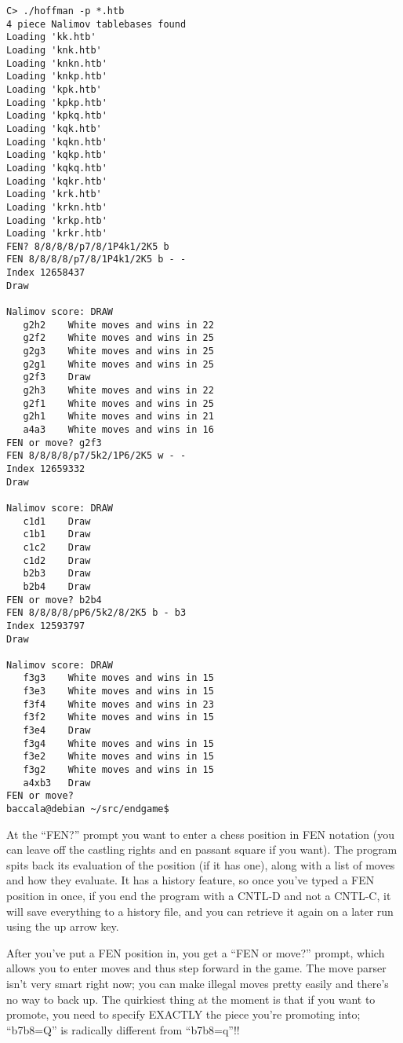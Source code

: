 \documentclass[11pt]{article}
\begin{document}
\begin{verbatim}
C> ./hoffman -p *.htb
4 piece Nalimov tablebases found
Loading 'kk.htb'
Loading 'knk.htb'
Loading 'knkn.htb'
Loading 'knkp.htb'
Loading 'kpk.htb'
Loading 'kpkp.htb'
Loading 'kpkq.htb'
Loading 'kqk.htb'
Loading 'kqkn.htb'
Loading 'kqkp.htb'
Loading 'kqkq.htb'
Loading 'kqkr.htb'
Loading 'krk.htb'
Loading 'krkn.htb'
Loading 'krkp.htb'
Loading 'krkr.htb'
FEN? 8/8/8/8/p7/8/1P4k1/2K5 b
FEN 8/8/8/8/p7/8/1P4k1/2K5 b - -
Index 12658437
Draw

Nalimov score: DRAW
   g2h2    White moves and wins in 22
   g2f2    White moves and wins in 25
   g2g3    White moves and wins in 25
   g2g1    White moves and wins in 25
   g2f3    Draw
   g2h3    White moves and wins in 22
   g2f1    White moves and wins in 25
   g2h1    White moves and wins in 21
   a4a3    White moves and wins in 16
FEN or move? g2f3
FEN 8/8/8/8/p7/5k2/1P6/2K5 w - -
Index 12659332
Draw

Nalimov score: DRAW
   c1d1    Draw
   c1b1    Draw
   c1c2    Draw
   c1d2    Draw
   b2b3    Draw
   b2b4    Draw
FEN or move? b2b4
FEN 8/8/8/8/pP6/5k2/8/2K5 b - b3
Index 12593797
Draw

Nalimov score: DRAW
   f3g3    White moves and wins in 15
   f3e3    White moves and wins in 15
   f3f4    White moves and wins in 23
   f3f2    White moves and wins in 15
   f3e4    Draw
   f3g4    White moves and wins in 15
   f3e2    White moves and wins in 15
   f3g2    White moves and wins in 15
   a4xb3   Draw
FEN or move?
baccala@debian ~/src/endgame$
\end{verbatim}

At the ``FEN?'' prompt you want to enter a chess position in FEN
notation (you can leave off the castling rights and en passant square
if you want).  The program spits back its evaluation of the position
(if it has one), along with a list of moves and how they evaluate.  It
has a history feature, so once you've typed a FEN position in once, if
you end the program with a CNTL-D and not a CNTL-C, it will save
everything to a history file, and you can retrieve it again on a later
run using the up arrow key.

After you've put a FEN position in, you get a ``FEN or move?'' prompt,
which allows you to enter moves and thus step forward in the game.
The move parser isn't very smart right now; you can make illegal moves
pretty easily and there's no way to back up.  The quirkiest thing at
the moment is that if you want to promote, you need to specify EXACTLY
the piece you're promoting into; ``b7b8=Q'' is radically different from
``b7b8=q''!!
\end{document}
